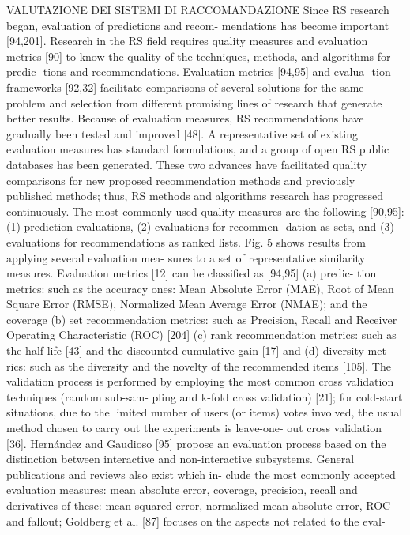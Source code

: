 \documentclass[11pt]{article}
\begin{document}
VALUTAZIONE DEI SISTEMI DI RACCOMANDAZIONE
Since RS research began, evaluation of predictions and recom-
mendations has become important [94,201]. Research in the RS
field requires quality measures and evaluation metrics [90] to know
the quality of the techniques, methods, and algorithms for predic-
tions and recommendations. Evaluation metrics [94,95] and evalua-
tion frameworks [92,32] facilitate comparisons of several solutions
for the same problem and selection from different promising lines
of research that generate better results.
Because of evaluation measures, RS recommendations have
gradually been tested and improved [48]. A representative set of
existing evaluation measures has standard formulations, and a
group of open RS public databases has been generated. These two
advances have facilitated quality comparisons for new proposed
recommendation methods and previously published methods; thus,
RS methods and algorithms research has progressed continuously.
The most commonly used quality measures are the following
[90,95]: (1) prediction evaluations, (2) evaluations for recommen-
dation as sets, and (3) evaluations for recommendations as ranked
lists. Fig. 5 shows results from applying several evaluation mea-
sures to a set of representative similarity measures.
Evaluation metrics [12] can be classified as [94,95] (a) predic-
tion metrics: such as the accuracy ones: Mean Absolute Error
(MAE), Root of Mean Square Error (RMSE), Normalized Mean Average
Error (NMAE); and the coverage (b) set recommendation metrics:
such as Precision, Recall and Receiver Operating Characteristic
(ROC) [204] (c) rank recommendation metrics: such as the half-life
[43] and the discounted cumulative gain [17] and (d) diversity met-
rics: such as the diversity and the novelty of the recommended
items [105]. The validation process is performed by employing
the most common cross validation techniques (random sub-sam-
pling and k-fold cross validation) [21]; for cold-start situations,
due to the limited number of users (or items) votes involved, the
usual method chosen to carry out the experiments is leave-one-
out cross validation [36].
Hernández and Gaudioso [95] propose an evaluation process
based on the distinction between interactive and non-interactive subsystems. General publications and reviews also exist which in-
clude the most commonly accepted evaluation measures: mean
absolute error, coverage, precision, recall and derivatives of these:
mean squared error, normalized mean absolute error, ROC and fallout;
Goldberg et al. [87] focuses on the aspects not related to the eval-
\end{document}

